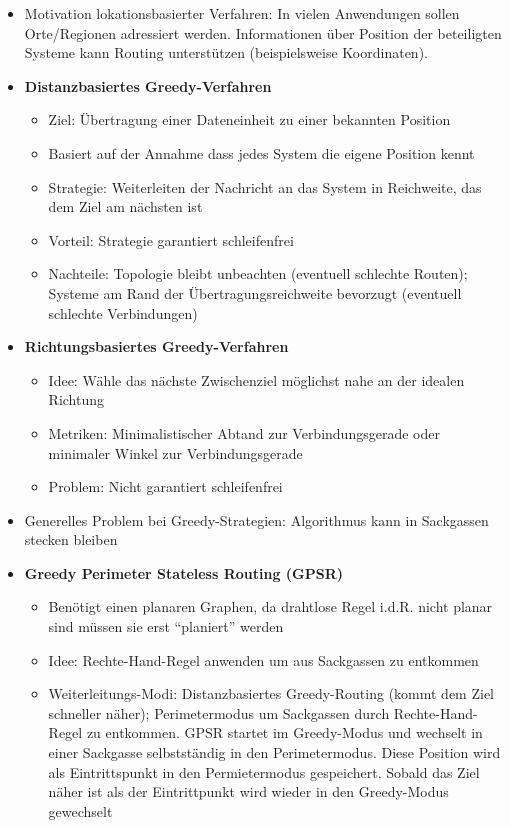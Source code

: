 \begin{itemize}
\begin{itemize}
\begin{itemize}
		\end{itemize}
	\end{itemize}
	\item Motivation lokationsbasierter Verfahren: In vielen Anwendungen sollen Orte/Regionen adressiert werden. Informationen über Position der beteiligten Systeme kann Routing unterstützen (beispielsweise Koordinaten).
	\item \textbf{Distanzbasiertes Greedy-Verfahren}
	\begin{itemize}
		\item Ziel: Übertragung einer Dateneinheit zu einer bekannten Position
		\item Basiert auf der Annahme dass jedes System die eigene Position kennt
		\item Strategie: Weiterleiten der Nachricht an das System in Reichweite, das dem Ziel am nächsten ist
		\item Vorteil: Strategie garantiert schleifenfrei
		\item Nachteile: Topologie bleibt unbeachten (eventuell schlechte Routen); Systeme am Rand der Übertragungsreichweite bevorzugt (eventuell schlechte Verbindungen)
	\end{itemize}
	\item \textbf{Richtungsbasiertes Greedy-Verfahren}
	\begin{itemize}
		\item Idee: Wähle das nächste Zwischenziel möglichst nahe an der idealen Richtung
		\item Metriken: Minimalistischer Abtand zur Verbindungsgerade oder minimaler Winkel zur Verbindungsgerade
		\item Problem: Nicht garantiert schleifenfrei
	\end{itemize}
	\item Generelles Problem bei Greedy-Strategien: Algorithmus kann in Sackgassen stecken bleiben
	\item \textbf{Greedy Perimeter Stateless Routing (GPSR)}
	\begin{itemize}
		\item Benötigt einen planaren Graphen, da drahtlose Regel i.d.R. nicht planar sind müssen sie erst "`planiert"' werden
		\item Idee: Rechte-Hand-Regel anwenden um aus Sackgassen zu entkommen
		\item Weiterleitungs-Modi: Distanzbasiertes Greedy-Routing (kommt dem Ziel schneller näher); Perimetermodus um Sackgassen durch Rechte-Hand-Regel zu entkommen. GPSR startet im Greedy-Modus und wechselt in einer Sackgasse selbstständig in den Perimetermodus. Diese Position wird als Eintrittspunkt in den Permietermodus gespeichert. Sobald das Ziel näher ist als der Eintrittpunkt wird wieder in den Greedy-Modus gewechselt
	\end{itemize}
\end{itemize}

